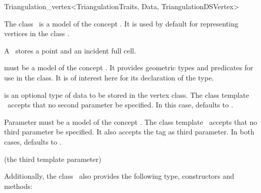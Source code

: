 \begin{ccRefClass}{Triangulation_vertex<TriangulationTraits, Data, TriangulationDSVertex>}

\ccDefinition

The class \ccRefName\ is a model of the concept . It is
used by default for representing vertices in the class
.

A \ccRefName\ stores a point and an incident full cell.


\ccParameters

 must be a model of the concept . It
provides geometric types and predicates for use in the
 class. It is of interest here for its
declaration of the  type.

 is an optional type of data to be stored in the vertex class. The
class template \ccRefName\ accepts that no second parameter be specified. In
this case,  defaults to .

Parameter 
 must be a model of the concept . The
class template \ccRefName\ accepts that no third parameter be specified. It
also accepts the tag  as third parameter. In both cases,
 defaults to .

\ccInheritsFrom

 (the third template parameter)

\ccIsModel


Additionally, the class \ccRefName\ also provides the following type,
constructors and methods:

\ccTypes


\ccCreation
{}



\end{ccRefClass}
